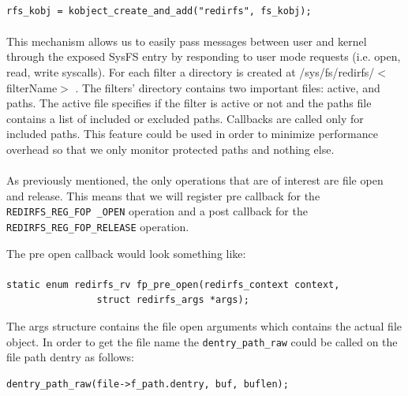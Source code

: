 	\paragraph{}
	\begin{Verbatim}[fontsize=\small, commandchars=\\\{\}]
	rfs_kobj = kobject_create_and_add("redirfs", fs_kobj);
	\end{Verbatim}
	
	\paragraph{}
	This mechanism allows us to easily pass messages between user and kernel through the exposed SysFS entry by responding to user mode requests (i.e. open, read, write syscalls). For each filter a directory is created at /sys/fs/redirfs/$<$ filterName$>$ \cite{RedirFS}. The filters' directory contains two important files: active, and paths. The active file specifies if the filter is active or not and the paths file contains a list of included or excluded paths. Callbacks are called only for included paths. This feature could be used in order to minimize performance overhead so that we only monitor protected paths and nothing else. 
	
	\paragraph{}
	As previously mentioned, the only operations that are of interest are file open and release. This means that we will register pre callback for the \texttt{REDIRFS\_REG\_FOP \_OPEN} operation and a post callback for the \texttt{REDIRFS\_REG\_FOP\_RELEASE} operation. 
	
	The pre open callback would look something like:
	\paragraph{}
	\begin{Verbatim}[fontsize=\small, commandchars=\\\{\}]
static enum redirfs_rv fp_pre_open(redirfs_context context,
				struct redirfs_args *args);
	\end{Verbatim}
	
	The args structure contains the file open arguments which contains the actual file object. In order to get the file name the \texttt{dentry\_path\_raw} could be called on the file path dentry as follows:
	\begin{Verbatim}[fontsize=\small, commandchars=\\\{\}]
	dentry_path_raw(file->f_path.dentry, buf, buflen);
	\end{Verbatim}
	
